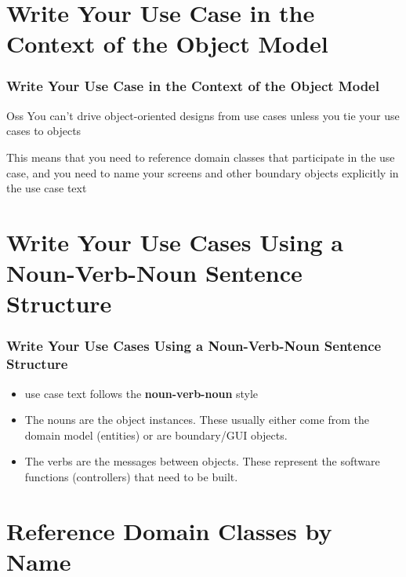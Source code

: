 \documentclass{beamer}
\begin{document}
\section{Write Your Use Case in the Context of the Object Model}
 
\begin{frame}
  \frametitle{Write Your Use Case in the Context of the Object Model}
      \begin{alertblock}{Oss}
      You can’t drive object-oriented designs from use cases unless you tie your use cases
to objects
      \end{alertblock}
      This means that you need to reference domain classes that participate in 
      the use case, and you need to name your screens and other boundary objects
explicitly in the use case text

 \end{frame}

\section{Write Your Use Cases Using a Noun-Verb-Noun Sentence Structure}
 
\begin{frame}
  \frametitle{Write Your Use Cases Using a Noun-Verb-Noun Sentence Structure}
                                         
  \begin{itemize}
        \item use case text follows the \textbf{noun-verb-noun} style
       \item The nouns are the object instances. These usually either come from
       the domain model (entities) or are boundary/GUI objects.
        \item The verbs are the messages between objects. These represent the software functions
(controllers) that need to be built.
 \end{itemize}
 \end{frame}

\section{Reference Domain Classes by Name}
  
\end{document}
